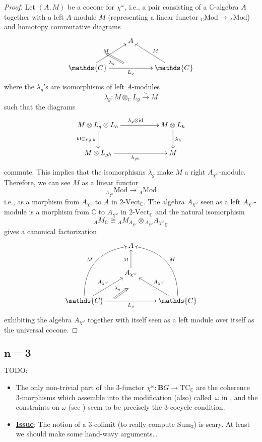 \documentclass[12pt]{scrartcl}
\newcommand{\boldB}{\boldsymbol{B}}
\newcommand{\C}{\mathds{C}}
\theoremstyle{definition}
\numberwithin{equation}{section}
\numberwithin{definition}{section}
\numberwithin{figure}{section}
\begin{document}
\begin{proof}
Let $(A,M)$ be a cocone for $\chi^\omega$, i.e., a pair consisting of a $\C$-algebra $A$ together with a left $A$-module $M$ (representing a linear functor ${}_\C\mathrm{Mod}\to {}_A\mathrm{Mod}$) and homotopy commutative diagrams
\[
\xymatrix{
&A\\
\C\ar[rr]_{L_g}\ar[ur]^{M}&&\C\ar[lu]_M
\ar@{=>}^{\lambda_g}(18,-11);(9,-6)}
\]
where the $\lambda_g$'s are isomorphisms of left $A$-modules
\[
\lambda_g\colon  M\otimes_\C L_g\xrightarrow{\sim} M
\]
such that the diagrams
\[
\xymatrix{
M\otimes L_g\otimes L_h\ar[rr]^{\lambda_{g}\otimes \mathrm{id}}\ar[d]_{\mathrm{id}\otimes \rho_{g,h}}&& M\otimes L_h\ar[d]^{\lambda_h}\\
M\otimes L_{gh}\ar[rr]_{\lambda_{gh}} &&M
}
\]
commute. This implies that the isomorphisms $\lambda_g$ make $M$ a right $A_{\chi^\omega}$-module. Therefore, we can see $M$ as a linear functor 
\[
{}_{A_{\chi^\omega}}\mathrm{Mod}\to {}_A\mathrm{Mod}
\]
i.e., as a morphism from $A_{\chi^\omega}$ to $A$ in $2\text{-}\mathrm{Vect}_\C$. The algebra $A_{\chi^\omega}$ seen as a left $A_{\chi^\omega}$-module is a morphism from $\C$ to $A_{\chi^\omega}$ in $2\text{-}\mathrm{Vect}_\C$ and the natural isomorphism
\[
{}_AM_\C\cong {}_AM_{A_{\chi^\omega}}\otimes {}_{A_{\chi^\omega}}{A_{\chi^\omega}}_\C
\]
gives a canonical factorization
\[
\xymatrix{
&A\\
&A_{\chi^\omega}\ar[u]^{M}\\
\C\ar[rr]_{L_g}\ar[ur]^{A_{\chi^\omega}}\ar@/^2pc/[ruu]^{M}&&\C\ar[lu]_{A_{\chi^\omega}}\ar@/_2pc/[luu]_{M}
\ar@{=>}^{\lambda_g}(15,-26);(22,-21)}
\]
exhibiting the algebra $A_{\chi^\omega}$ together with itself seen as a left module over itself as the universal cocone. 
\end{proof}


\subsection[$n=3$]{$\boldsymbol{n=3}$}

TODO:
\begin{itemize}
\item
The only non-trivial part of the 3-functor $\chi^\omega \colon \boldB G \to \text{TC}_\C$ are the coherence 3-morphisms which assemble into the modification (also) called~$\omega$ in \cite[Def.\,A.4.3]{GregorDiss}, and the constraints on $\omega$ (see \cite[Page~219]{GregorDiss}) seem to be precisely the 3-cocycle condition. 
\item
\underline{\textbf{Issue}}: The notion of a 3-colimit (to really compute $\text{Sum}_3$) is scary. 
At least we should make some hand-wavy arguments\dots
\end{itemize}
\end{document}
